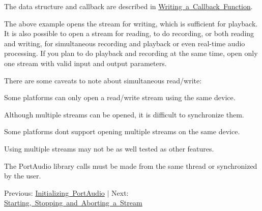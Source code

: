 \begin{DoxyCode}{0}
\end{DoxyCode}


The data structure and callback are described in \mbox{\hyperlink{writing_a_callback}{Writing a Callback Function}}.

The above example opens the stream for writing, which is sufficient for playback. It is also possible to open a stream for reading, to do recording, or both reading and writing, for simultaneous recording and playback or even real-\/time audio processing. If you plan to do playback and recording at the same time, open only one stream with valid input and output parameters.

There are some caveats to note about simultaneous read/write\+:


\begin{DoxyItemize}
\item Some platforms can only open a read/write stream using the same device.
\item Although multiple streams can be opened, it is difficult to synchronize them.
\item Some platforms don\textquotesingle{}t support opening multiple streams on the same device.
\item Using multiple streams may not be as well tested as other features.
\item The Port\+Audio library calls must be made from the same thread or synchronized by the user.
\end{DoxyItemize}

Previous\+: \mbox{\hyperlink{initializing_portaudio}{Initializing Port\+Audio}} $\vert$ Next\+: \mbox{\hyperlink{start_stop_abort}{Starting, Stopping and Aborting a Stream}} 